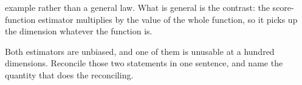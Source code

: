 \begin{furtherproblems}
{  example rather than a general law. What is general is the contrast: the
  score-function estimator multiplies by the value of the whole function, so
  it picks up the dimension whatever the function is.}
\item Both estimators are unbiased, and one of them is unusable at a hundred
  dimensions. Reconcile those two statements in one sentence, and name the
  quantity that does the reconciling.
\end{furtherproblems}
